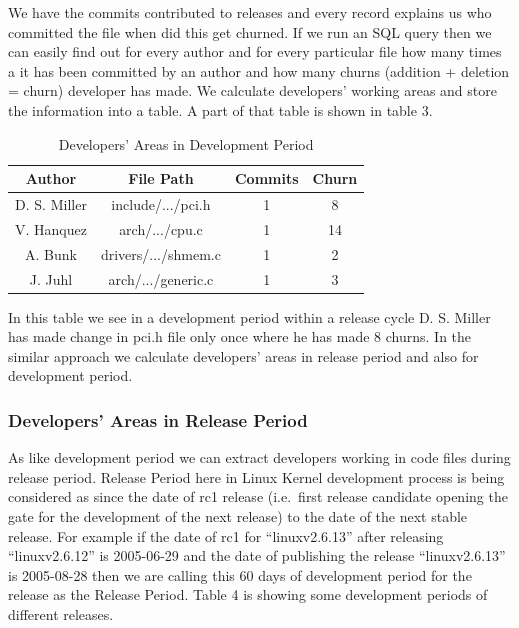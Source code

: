 \documentclass{acm_proc_article-sp}
\begin{document}
We have the commits contributed to releases and every record explains us who committed the file when did this get churned. If we run an SQL query then we can easily find out for every author and for every particular file how many times a it has been committed by an author and how many churns (addition + deletion = churn) developer has made. We calculate developers' working areas and store the information into a table. A part of that table is shown in table 3.

\begin{table}[ht]
\caption{Developers' Areas in Development Period}  %
\centering 						%
\begin{tabular}{c c c c}				%
\hline\hline						%
Author		& File Path			& Commits		& Churn \\ [0.5ex]
\hline 							%
D. S. Miller	& include/.../pci.h		& 1				& 8 \\
V. Hanquez	& arch/.../cpu.c		& 1				& 14 \\
A. Bunk		& drivers/.../shmem.c	& 1				& 2 \\
J. Juhl		& arch/.../generic.c		& 1				& 3 \\
[1ex]							%
\hline 							%
\end{tabular}
\label{table:nonlin} 				%
\end{table}

In this table we see in a development period within a release cycle D. S. Miller has made change in pci.h file only once where he has made 8 churns. In the similar approach we calculate developers' areas in release period and also for development period.

\subsubsection{Developers' Areas in Release Period}
As like development period we can extract developers working in code files during release period. Release Period here in Linux Kernel development process is being considered as since the date of rc1 release (i.e.\ first release candidate opening the gate for the development of the next release) to the date of the next stable release. For example if the date of rc1 for ``linuxv2.6.13'' after releasing ``linuxv2.6.12'' is 2005-06-29 and the date of publishing the release ``linuxv2.6.13'' is 2005-08-28 then we are calling this 60 days of development period for the release as the Release Period. Table 4 is showing some development periods of different releases.
\end{document}
